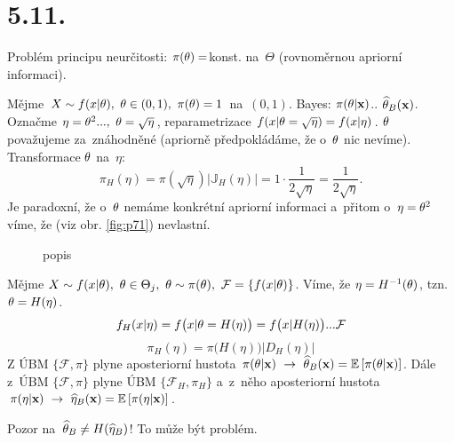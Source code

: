 \section{5.11.}
Problém principu neurčitosti: $\pi(\theta)=$konst. na~$\Theta$ (rovnoměrnou apriorní informaci).
\begin{example}
	Mějme $X\sim f(x|\theta),~\theta\in(0,1),~\pi(\theta)=1$ na~$(0,1)$. Bayes: $\pi(\theta|\textbf{x})$.. $\widehat{\theta}_B(\textbf{x})$. Označme $\eta=\theta^2...,~\theta=\sqrt{\eta}$, reparametrizace $f(x|\theta=\sqrt{\eta})=f(x|\eta)$. $\theta$ považujeme za~znáhodněné (apriorně předpokládáme, že o~$\theta$ nic nevíme). Transformace $\theta$ na~$\eta$: $$\pi_H(\eta)=\pi(\sqrt{\eta})\big|\mathbb{J}_H(\eta)\big|=1\cdot\frac{1}{2\sqrt{\eta}}=\frac{1}{2\sqrt{\eta}}.$$
	Je paradoxní, že o~$\theta$ nemáme konkrétní apriorní informaci a~přitom o~$\eta=\theta^2$ víme, že (viz obr. \ref{fig:p71}) nevlastní.

\begin{figure}[h]
	\centering
	\caption{popis}
\end{figure}

\end{example}
\begin{example}
	Mějme $X\sim f(x|\theta),~\theta\in\Theta_j,~\theta\sim\pi(\theta),~\mathcal{F}=\{f(x|\theta)\}$. Víme, že $\eta=H^{-1}(\theta)$, tzn. $\theta=H(\eta)$. 
	$$ f_H(x|\eta)=f\big(x|\theta=H(\eta)\big)=f\big(x|H(\eta)\big)...\mathcal{F}$$
	$$ \pi_H(\eta)=\pi\big(H(\eta)\big)\big|D_H(\eta)\big|$$
	Z ÚBM $\{\mathcal{F},\pi\}$ plyne aposteriorní hustota $\pi(\theta|\textbf{x})~\to~\widehat{\theta}_B(\textbf{x})=\mathbb{E}\left[ \pi(\theta|\textbf{x}) \right]$. Dále z~ÚBM $\{\mathcal{F},\pi\}$ plyne ÚBM $\{\mathcal{F}_H,\pi_H\}$ a~z~něho aposteriorní hustota $\pi(\eta|\textbf{x})~\to~ \widehat{\eta}_B(\textbf{x})=\mathbb{E}\left[ \pi(\eta|\textbf{x}) \right]$. 
	
	Pozor na~$\widehat{\theta}_B\neq H(\widehat{\eta}_B)$! To může být problém.
\end{example}
